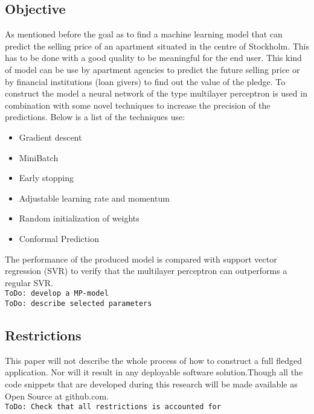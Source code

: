 \subsection{Objective}
As mentioned before the goal as to find a machine learning model that can predict the selling price of an apartment situated in the centre of Stockholm. This has to be done with a good quality to be meaningful for the end user. This kind of model can be use by apartment agencies to predict the future selling price or by financial institutions (loan givers) to find out the value of the pledge. To construct the model a neural network of the type multilayer perceptron is used in combination with some novel techniques to increase the precision of the predictions. Below is a list of the techniques use:
\begin{itemize}
\item Gradient descent
\item MiniBatch
\item Early stopping
\item Adjustable learning rate and momentum
\item Random initialization of weights
\item Conformal Prediction
\end{itemize}
The performance of the produced model is compared with support vector regression (SVR) to verify that the multilayer perceptron can outperforms a regular SVR. 
\\
\texttt{ToDo: develop a MP-model} \\
\texttt{ToDo: describe selected parameters} \\

\subsection{Restrictions}
This paper will not describe the whole process of how to construct a full fledged application. Nor will it result in any deployable software solution.Though all the code snippets that are developed during this research will be made available as Open Source at github.com.
\\
\texttt{ToDo: Check that all restrictions is accounted for}\\


